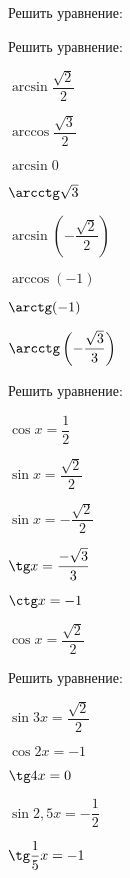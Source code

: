 \begin{listofex}
	\item Решить уравнение:
	\begin{enumcols}[itemcolumns=2]
		\item {}
		\item {}
		\item {}
		\item {}
		\item {}
		\item {}
	\end{enumcols}
	\item Решить уравнение:
	\begin{enumcols}[itemcolumns=4]
		\item \( \arcsin\dfrac{\sqrt{2}}{2} \)
		\item \( \arccos\dfrac{\sqrt{3}}{2} \)
		\item \( \arcsin0 \)
		\item \( \arcctg\sqrt{3} \)
		\item \( \arcsin\left( -\dfrac{\sqrt{2}}{2} \right) \)
		\item \( \arccos\left( -1 \right) \)
		\item \( \arctg(-1) \)
		\item \( \arcctg\left( -\dfrac{\sqrt{3}}{3} \right) \)
	\end{enumcols}
	\item Решить уравнение:
	\begin{enumcols}[itemcolumns=3]
		\item \( \cos x = \dfrac{1}{2} \)
		\item \( \sin x = \dfrac{\sqrt{2}}{2} \)
		\item \( \sin x = -\dfrac{\sqrt{2}}{2} \)
		\item \( \tg x = \dfrac{-\sqrt{3}}{3} \)
		\item \( \ctg x = -1 \)
		\item \( \cos x = \dfrac{\sqrt{2}}{2} \)
	\end{enumcols}
	\item Решить уравнение:
	\begin{enumcols}[itemcolumns=3]
		\item \( \sin 3x = \dfrac{\sqrt{2}}{2} \)
		\item \( \cos 2x = -1 \)
		\item \( \tg 4x = 0 \)
		\item \( \sin 2,5x = -\dfrac{1}{2} \)
		\item \( \tg \dfrac{1}{5}x = -1 \)

\end{enumcols}
\end{listofex}
